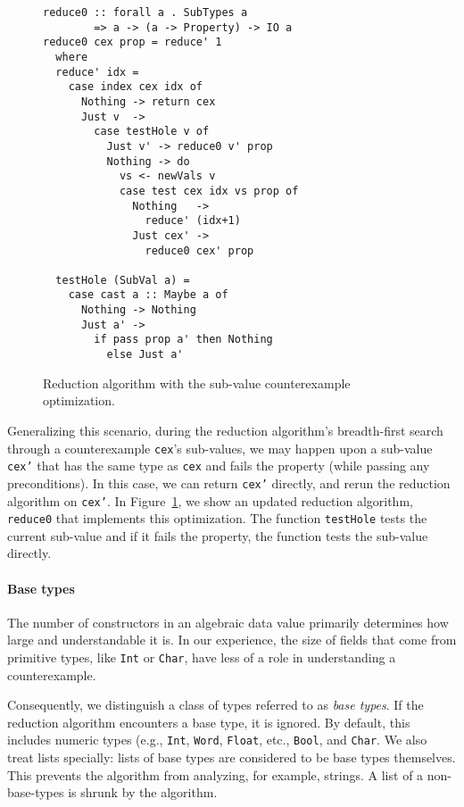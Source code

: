 \documentclass[10pt]{sigplanconf}
\newcommand{\ttp}[1]{\texttt{#1}}
\begin{document}
\begin{figure}
\begin{lstlisting}
reduce0 :: forall a . SubTypes a 
        => a -> (a -> Property) -> IO a
reduce0 cex prop = reduce' 1
  where
  reduce' idx = 
    case index cex idx of 
      Nothing -> return cex
      Just v  -> 
        case testHole v of
          Just v' -> reduce0 v' prop
          Nothing -> do
            vs <- newVals v
            case test cex idx vs prop of
              Nothing   -> 
                reduce' (idx+1)
              Just cex' -> 
                reduce0 cex' prop

  testHole (SubVal a) = 
    case cast a :: Maybe a of
      Nothing -> Nothing
      Just a' -> 
        if pass prop a' then Nothing
          else Just a'
\end{lstlisting}
  \caption{Reduction algorithm with the sub-value counterexample optimization.}
  \label{fig:reduce0}
\end{figure}

Generalizing this scenario, during the reduction algorithm's breadth-first
search through a counterexample \ttp{cex}'s sub-values, we may happen upon a
sub-value \ttp{cex'} that has the same type as \ttp{cex} and fails the property
(while passing any preconditions).  In this case, we can return \ttp{cex'}
directly, and rerun the reduction algorithm on \ttp{cex'}.  In
Figure~\ref{fig:reduce0}, we show an updated reduction algorithm, \ttp{reduce0}
that implements this optimization.  The function \ttp{testHole} tests the
current sub-value and if it fails the property, the function tests the sub-value
directly.

\paragraph{Base types}

The number of constructors in an algebraic data value primarily determines how
large and understandable it is.  In our experience, the size of fields that come
from primitive types, like \ttp{Int} or \ttp{Char}, have less of a role in
understanding a counterexample.

Consequently, we distinguish a class of types referred to as \emph{base types}.
If the reduction algorithm encounters a base type, it is ignored.  By default,
this includes numeric types (e.g., \ttp{Int}, \ttp{Word}, \ttp{Float}, etc.,
\ttp{Bool}, and \ttp{Char}.  We also treat lists specially: lists of base types
are considered to be base types themselves.  This prevents the algorithm from
analyzing, for example, strings.  A list of a non-base-types is shrunk by the
algorithm.  
\end{document}
